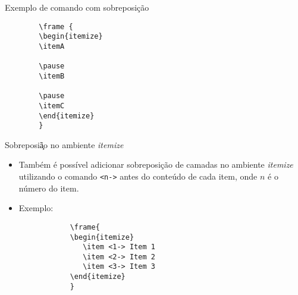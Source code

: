 \documentclass{beamer}
\begin{document}
\begin{frame}[fragile]

\begin{block}{Exemplo de comando com sobreposi\c c\~ao}
    \begin{verbatim}
        \frame { 
        \begin{itemize} 
        \itemA 
        
        \pause 
        \itemB 
        
        \pause 
        \itemC 
        \end{itemize} 
        }
    \end{verbatim}
\end{block}
\end{frame}

\begin{frame}[fragile]

\begin{block}{Sobreposi\c \~ao no ambiente \textit{itemize}}
    \begin{itemize}
        \item <1-> Tamb\'em \'e poss\'ivel adicionar sobreposi\c c\~ao de camadas no ambiente \textit{itemize} utilizando o comando \verb|<n->| antes do conte\'udo de cada item, onde $n$ \'e o n\'umero do item.

        \item <2-> Exemplo:
        \begin{verbatim}
            \frame{
            \begin{itemize}
               \item <1-> Item 1
               \item <2-> Item 2
               \item <3-> Item 3
            \end{itemize}
            }
        \end{verbatim}
        
    \end{itemize}
\end{block}
 
\end{frame}
\end{document}
